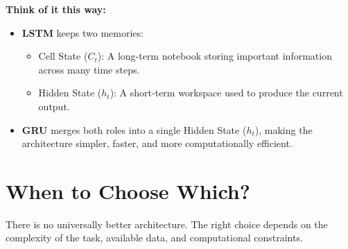 \documentclass[11pt]{article}
\begin{document}
\begin{infobox}[top=8pt, bottom=8pt, left=12pt, right=12pt]
{\large\color{brandnavy}\textbf{Think of it this way:}}

\vspace{0.05in}
{\fontsize{10}{12}\selectfont
\begin{itemize}[leftmargin=*, itemsep=0pt, parsep=0pt, topsep=3pt, label={\color{brandnavy}\textbullet}]
  \item \textbf{LSTM} keeps two memories:
    \begin{itemize}[leftmargin=*, itemsep=0pt, parsep=0pt, topsep=3pt, label={\color{brandnavy}\textbullet}]
      \item Cell State ($C_t$): A long‑term notebook storing important information across many time steps.
      \item Hidden State ($h_t$): A short‑term workspace used to produce the current output.
    \end{itemize}
  \item \textbf{GRU} merges both roles into a single Hidden State ($h_t$), making the architecture simpler, faster, and more computationally efficient.
\end{itemize}
}
\end{infobox}
\newpage


\section*{When to Choose Which?}

\vspace{0.1in}

There is no universally better architecture.
The right choice depends on the complexity of the task,
available data, and computational constraints.

\vspace{0.15in}
\end{document}
